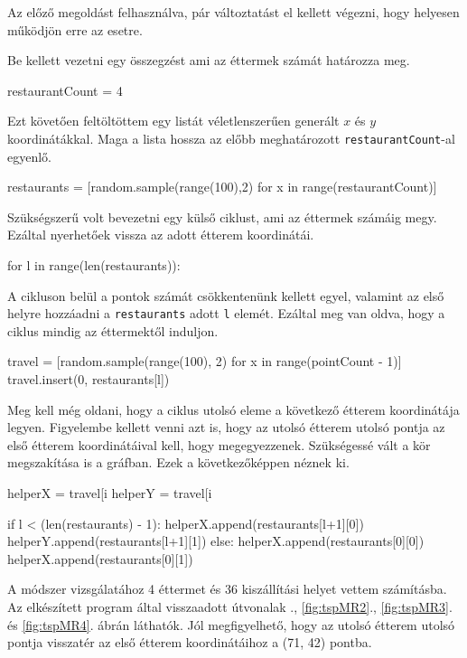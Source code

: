 
Az előző megoldást felhasználva, pár változtatást el kellett végezni, hogy helyesen működjön erre az esetre.

Be kellett vezetni egy összegzést ami az éttermek számát határozza meg.
\begin{python}
restaurantCount = 4
\end{python}
Ezt követően feltöltöttem egy listát véletlenszerűen generált $x$ és $y$ koordinátákkal. Maga a lista hossza az előbb meghatározott \texttt{restaurantCount}-al egyenlő.
\begin{python}
restaurants = [random.sample(range(100),2)
               for x in range(restaurantCount)] 
\end{python}
Szükségszerű volt bevezetni egy külső ciklust, ami az éttermek számáig megy. Ezáltal nyerhetőek vissza az adott étterem koordinátái.
\begin{python}
for l in range(len(restaurants)):
\end{python}
A cikluson belül a pontok számát csökkentenünk kellett egyel, valamint az első helyre hozzáadni a \texttt{restaurants} adott \texttt{l} elemét. Ezáltal meg van oldva, hogy a ciklus mindig az éttermektől induljon.

\begin{python}
travel = [random.sample(range(100), 2) for x in range(pointCount - 1)]
travel.insert(0, restaurants[l])
\end{python}

Meg kell még oldani, hogy a ciklus utolsó eleme a következő étterem koordinátája legyen. Figyelembe kellett venni azt is, hogy az utolsó étterem utolsó pontja az első étterem koordinátáival kell, hogy megegyezzenek. Szükségessé vált a kör megszakítása is a gráfban. 
Ezek a következőképpen néznek ki. 
\begin{python}
helperX = travel[i %
helperY = travel[i %

if l < (len(restaurants) - 1):
	helperX.append(restaurants[l+1][0])
	helperY.append(restaurants[l+1][1])
else:
	helperX.append(restaurants[0][0])
	helperX.append(restaurants[0][1])
\end{python}


A módszer vizsgálatához 4 éttermet és 36 kiszállítási helyet vettem számításba.
Az elkészített program által visszaadott útvonalak ., \ref{fig:tspMR2}., \ref{fig:tspMR3}.  és \ref{fig:tspMR4}. ábrán láthatók.
Jól megfigyelhető, hogy az utolsó étterem utolsó pontja visszatér az első étterem koordinátáihoz a (71, 42) pontba.

